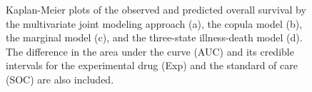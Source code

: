 \begin{figure}
    \centering
    \hfill
    \caption{Kaplan-Meier plots of the observed and predicted overall survival by the multivariate joint modeling approach (a), the copula model (b), the marginal model (c), and the three-state illness-death model (d). The difference in the area under the curve (AUC) and its credible intervals for the experimental drug (Exp) and the standard of care (SOC) are also included.}
    \label{fig:predictionKM}
\end{figure}

